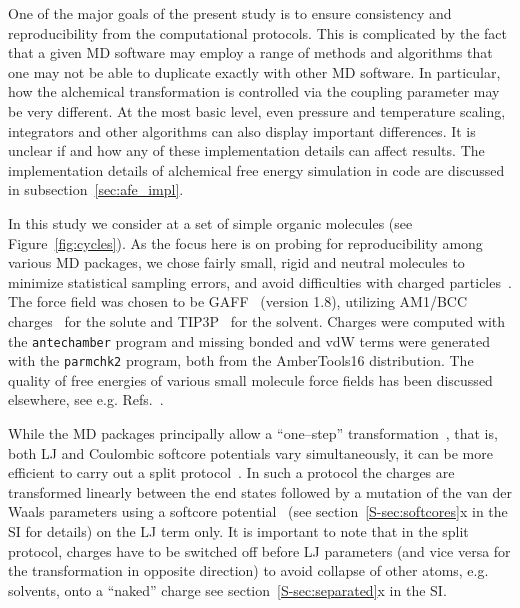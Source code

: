 \documentclass[journal=jctcce,manuscript=article]{achemso}
\newcommand{\progname}[1]{\texttt{#1}}
\begin{document}
One of the major goals of the present study is to ensure
consistency and reproducibility from the computational protocols.  This is complicated by the fact
that a given MD software may employ a range of methods and algorithms that one may not be 
able to duplicate exactly with other MD software.  
In particular,  how the alchemical transformation is controlled via the coupling parameter may be very different.
At the most basic level, even pressure and temperature scaling, integrators and other algorithms can also display important differences.  
It is unclear if and how any of these implementation details can affect results. 
The implementation details of alchemical free energy simulation in code are discussed in subsection~\ref{sec:afe_impl}.

In this study we consider at a set of simple organic molecules (see
Figure~\ref{fig:cycles}).  As the focus here is on probing for
reproducibility among various MD packages, we chose fairly small,
rigid and neutral molecules to minimize statistical sampling errors, and
avoid difficulties with charged
particles~\cite{rocklin_calculating_2013, JCC:JCC1050}.  The force
field was chosen to be GAFF~\cite{wang_development_2004} (version
1.8), utilizing AM1/BCC charges~\cite{jakalian_fast_2000,
  jakalian_fast_2002} for the solute and
TIP3P~\cite{jorgensen_comparison_1983-1} for the solvent.  
Charges were 
computed with the \progname{antechamber} program and missing bonded and vdW 
terms were generated with the \progname{parmchk2} program, both from the 
AmberTools16 distribution.  The quality of free energies of various small 
molecule force fields has been discussed
elsewhere, see e.g. Refs.~.

While the MD packages principally allow a ``one--step'' 
transformation~\cite{steinbrecher_soft-core_2011},
that is, both LJ and Coulombic softcore potentials vary
simultaneously, it can be more efficient to carry out a
split protocol~\cite{Deng-2004,naden_linear_2014, naden_linear_2015}. 
In such a protocol the charges are transformed
linearly between the end states followed by a mutation of the van der
Waals parameters using a softcore
potential~\cite{beutler_avoiding_1994,
  zacharias_separationshifted_1994} (see section~\ref{S-sec:softcores}x in the 
SI for details) on the LJ term only.  It is important to note that in the split protocol, charges have to be switched off before LJ parameters (and vice versa
for the transformation in opposite direction) to avoid collapse of
other atoms, e.g. solvents, onto a ``naked'' 
charge\cite{pitera_comparison_2002, anwar_robust_2005, 
steinbrecher_soft-core_2011} see section~\ref{S-sec:separated}x in the SI.
\end{document}
